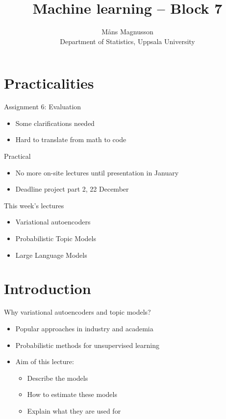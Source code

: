 \documentclass[10pt]{beamer}
\title[]{{\color{black}Machine learning -- Block 7}}
\author[]{M{\aa}ns Magnusson\\Department of Statistics, Uppsala University}
\date{\currentsemester}
\begin{document}
\frame{\titlepage
}


\section{Practicalities}

\begin{frame}{Assignment 6: Evaluation}

\begin{itemize}
\item Some clarifications needed
\item Hard to translate from math to code
\end{itemize}

\end{frame}


\begin{frame}{Practical}

\begin{itemize}
\item No more on-site lectures until presentation in January
\item Deadline project part 2, 22 December
\end{itemize}

\end{frame}



\begin{frame}{This week's lectures}
\begin{itemize}
\item Variational autoencoders
\item Probabilistic Topic Models
\item Large Language Models
\end{itemize}
\end{frame}



\section{Introduction}
\frame{\sectionpage}

\begin{frame}{Why variational autoencoders and topic models?}
\begin{itemize}
\item Popular approaches in {\color{uured}industry and academia}
\item {\color{uured}Probabilistic} methods for unsupervised learning\pause
\item {\color{uured}Aim} of this lecture:
\begin{itemize}
\item Describe the models
\item How to estimate these models
\item Explain what they are used for
\end{itemize}
\end{itemize}
\end{frame}
\end{document}
